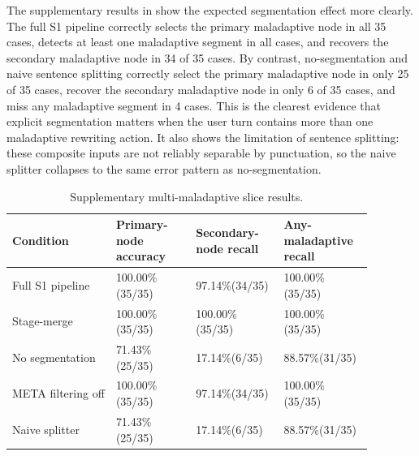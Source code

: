 The supplementary results in  show the expected segmentation
effect more clearly. The full S1 pipeline correctly selects the primary maladaptive node
in all 35 cases, detects at least one maladaptive segment in all cases, and recovers the
secondary maladaptive node in 34 of 35 cases. By contrast, no-segmentation and naive
sentence splitting correctly select the primary maladaptive node in only 25 of 35
cases, recover the secondary maladaptive node in only 6 of 35 cases, and miss any
maladaptive segment in 4 cases. This is the clearest evidence that explicit segmentation
matters when the user turn contains more than one maladaptive rewriting action. It also
shows the limitation of sentence splitting: these composite inputs are not reliably
separable by punctuation, so the naive splitter collapses to the same error pattern as
no-segmentation.

\begin{table}
  \centering
  \caption{Supplementary multi-maladaptive slice results.}
  \label{tab:mal-mal-results}
  \small
  \setlength{\tabcolsep}{5pt}
  \renewcommand{\arraystretch}{1.18}
  \begin{tabular}{p{0.26\linewidth}p{0.20\linewidth}p{0.22\linewidth}p{0.20\linewidth}}
    \toprule
    Condition & Primary-node accuracy & Secondary-node recall & Any-maladaptive recall \\
    \midrule
    Full S1 pipeline & 100.00\%\newline (35/35) & 97.14\%\newline (34/35) & 100.00\%\newline (35/35) \\
    Stage-merge & 100.00\%\newline (35/35) & 100.00\%\newline (35/35) & 100.00\%\newline (35/35) \\
    No segmentation & 71.43\%\newline (25/35) & 17.14\%\newline (6/35) & 88.57\%\newline (31/35) \\
    META filtering off & 100.00\%\newline (35/35) & 97.14\%\newline (34/35) & 100.00\%\newline (35/35) \\
    Naive splitter & 71.43\%\newline (25/35) & 17.14\%\newline (6/35) & 88.57\%\newline (31/35) \\
    \bottomrule
  \end{tabular}
\end{table}

